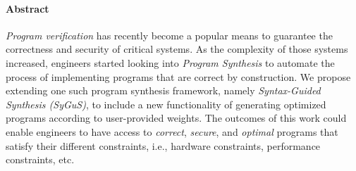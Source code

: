 \paragraph{Abstract}
\emph{Program verification} has recently become a popular means to guarantee the correctness and security of critical systems.
%
As the complexity of those systems increased, engineers started looking into \emph{Program Synthesis} to automate the process of implementing programs that are correct by construction.
%
We propose extending one such program synthesis framework, namely \emph{Syntax-Guided Synthesis (SyGuS)}, to include a new functionality of generating optimized programs according to user-provided weights.
%
The outcomes of this work could enable engineers to have access to \emph{correct}, \emph{secure}, and \emph{optimal} programs that satisfy their different constraints, i.e., hardware constraints, performance constraints, etc.

